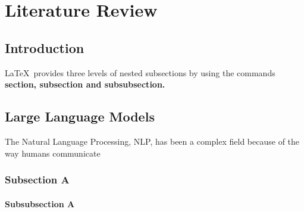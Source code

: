 

\chapter{Literature Review}  

\section{Introduction}


\noindent \LaTeX\ provides three levels of nested subsections by using the commands \textbf{section, subsection and subsubsection.} %

\section{Large Language Models}
\noindent The Natural Language Processing, NLP, has been a complex field because of the way humans communicate 

\subsection{Subsection A}
\noindent \lipsum[1][1] %

\subsubsection{Subsubsection A}
\noindent \lipsum[1][1] %


